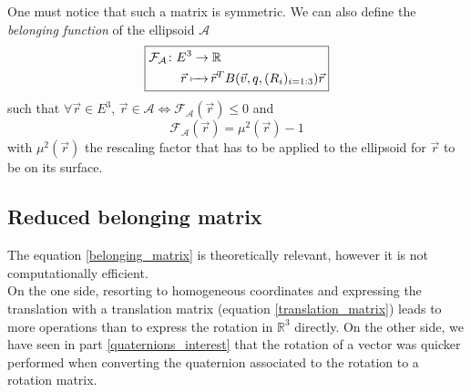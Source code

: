 \documentclass[class=report, float=false, crop=false]{standalone}
\begin{document}
One must notice that such a matrix is symmetric. We can also define the \textit{belonging function} of the ellipsoid $\mathcal{A}$
\begin{equation}
\boxed{\begin{aligned}\mathcal{F}_{\mathcal{A}} \colon &E^3 \to \mathbb{R}\\     &\phantomarrow{E^3}{\vec{r}} \vec{r}^TB(\vec{v},q,(R_i)_{i=1:3})\vec{r}\end{aligned}}
\label{belonging_function}
\end{equation}
such that $\forall \vec{r} \in E^3$, $\vec{r} \in \mathcal{A} \Leftrightarrow \mathcal{F}_{\mathcal{A}}(\vec{r}) \leq 0$ and
\begin{equation}
\boxed{\mathcal{F}_{\mathcal{A}}(\vec{r}) = \mu^2(\vec{r}) - 1}
\end{equation}
with $\mu^2(\vec{r})$ the rescaling factor that has to be applied to the ellipsoid for $\vec{r}$ to be on its surface.

\subsection{Reduced belonging matrix}

The equation \ref{belonging_matrix} is theoretically relevant, however it is not computationally efficient.\\

On the one side, resorting to homogeneous coordinates and expressing the translation with a translation matrix (equation \ref{translation_matrix}) leads to more operations than to express the rotation in $\mathbb{R}^3$ directly. On the other side, we have seen in part \ref{quaternions_interest} that the rotation of a vector was quicker performed when converting the quaternion associated to the rotation to a rotation matrix.\\
\end{document}
